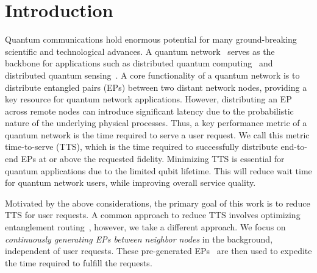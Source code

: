 \section{Introduction}
\label{sec:intro}

Quantum communications hold enormous potential for many ground-breaking scientific and technological advances. 
A quantum network~\cite{wehner2018quantum} serves as the backbone for applications such as %
distributed quantum computing~\cite{calaffi-dqc-cn24} and distributed quantum sensing~\cite{zang-dqs,zhan-opt-24,hillery-qsn-pra23,zhan-localization-qce23}. 
A core functionality of a quantum network is to distribute entangled pairs (EPs) between two distant network nodes, providing a key resource for quantum network applications.
However, distributing an EP across remote nodes can introduce significant latency due to the probabilistic nature of the underlying physical processes. 
Thus, a key performance metric of a quantum network is the time required to serve a user request.
We call this metric time-to-serve (TTS), which is the time required to successfully distribute end-to-end EPs at or above the requested fidelity.
Minimizing TTS is essential for quantum applications due to the limited qubit lifetime.
This will reduce wait time for quantum network users, while improving overall service quality.

Motivated by the above considerations, the primary goal of this work is to reduce TTS for user requests. 
A common approach to reduce TTS involves optimizing entanglement routing~\cite{caleffi-routing-access17,shi-routing-sigcomm20,ghader-swappingtree-tqe22,abane-routingsurvey}, however, we take a different approach.
We focus on \emph{continuously generating EPs between neighbor nodes} in the background, independent of user requests. 
These pre-generated EPs~\cite{kolar-ac-infocom22,inesta-continuous-pra23,ghader-predistribution-qce22} are then used to expedite the time required to fulfill the requests. 

